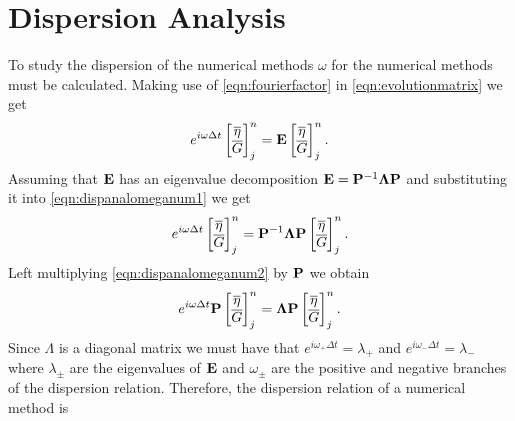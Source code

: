 \section{Dispersion Analysis}
To study the dispersion of the numerical methods $\omega$ for the numerical methods must be calculated. Making use of \eqref{eqn:fourierfactor} in \eqref{eqn:evolutionmatrix} we get 
\begin{equation}
e^{i \omega \Delta t}\begin{bmatrix}
\overline{\eta} \\ \overline{G}
\end{bmatrix}^{n}_j =  \mathbf{E}\begin{bmatrix}
\overline{\eta} \\ \overline{G}
\end{bmatrix}^{n}_j.
\label{eqn:dispanalomeganum1}
\end{equation}
Assuming that $\mathbf{E}$ has an eigenvalue decomposition $\mathbf{E} = \mathbf{P}^{-1} \mathbf{\Lambda} \mathbf{P}$ and substituting it into \eqref{eqn:dispanalomeganum1} we get
\begin{equation}
e^{i \omega \Delta t}\begin{bmatrix}
\overline{\eta} \\ \overline{G}
\end{bmatrix}^{n}_j =  \mathbf{P}^{-1} \mathbf{\Lambda} \mathbf{P}\begin{bmatrix}
\overline{\eta} \\ \overline{G}
\end{bmatrix}^{n}_j.
\label{eqn:dispanalomeganum2}
\end{equation}
Left multiplying \eqref{eqn:dispanalomeganum2} by $\mathbf{P}$ we obtain
\begin{equation}
e^{i \omega \Delta t} \mathbf{P}\begin{bmatrix}
\overline{\eta} \\ \overline{G}
\end{bmatrix}^{n}_j =   \mathbf{\Lambda} \mathbf{P}\begin{bmatrix}
\overline{\eta} \\ \overline{G}
\end{bmatrix}^{n}_j.
\label{eqn:dispanalomeganum3}
\end{equation}
Since $\Lambda$ is a diagonal matrix we must have that $e^{i \omega_+ \Delta t} = \lambda_+$ and $e^{i \omega_- \Delta t} = \lambda_-$ where $\lambda_\pm$ are the eigenvalues of $\mathbf{E}$ and $\omega_\pm$ are the positive and negative branches of the dispersion relation. Therefore, the dispersion relation of a numerical method is
